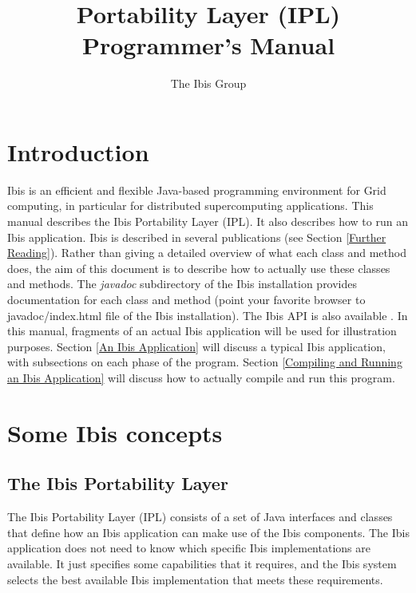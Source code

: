 \documentclass[10pt]{article}
\newcommand{\mysection}[1]{\section{#1}\label{#1}}
\newcommand{\mysubsection}[1]{\subsection{#1}\label{#1}}
\begin{document}
\title{
{}
{}
Portability Layer (IPL) Programmer's Manual}

\author{The Ibis Group}

\maketitle

\section{Introduction}

Ibis is an efficient and flexible Java-based programming environment for Grid
computing, in particular for distributed supercomputing applications.
This manual describes the Ibis Portability Layer (IPL). It also describes
how to run an Ibis application.
Ibis is described in several publications (see Section \ref{Further Reading}).
Rather than giving a detailed overview of what each class and method does,
the aim of this document is to describe how to actually use these classes
and methods.
The \emph{javadoc} subdirectory of the Ibis installation provides
documentation for each class and method (point your favorite browser
to javadoc/index.html file of the Ibis installation).
The Ibis API is also available
.
In this manual, fragments of an actual Ibis application will be used for
illustration purposes.
Section \ref{An Ibis Application} will discuss a typical Ibis application,
with subsections on each phase of the program.
Section \ref{Compiling and Running an Ibis Application} will discuss how to
actually compile and run this program.

\mysection{Some Ibis concepts}

\mysubsection{The Ibis Portability Layer}

The Ibis Portability Layer (IPL) consists of a set of Java interfaces and
classes that define how an Ibis application can make use of the Ibis components.
The Ibis application does not need to know which specific Ibis implementations
are available.
It just specifies some capabilities that it requires, and the Ibis system
selects the best available Ibis implementation that meets these requirements.
 
\end{document}
